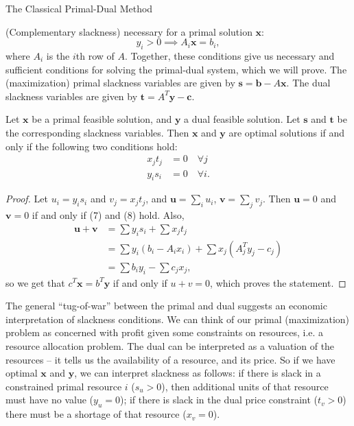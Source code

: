 \begin{section}{The Classical Primal-Dual Method}
\begin{definition}{(Complementary slackness)}
		necessary for a primal solution $\mathbf{x}$:
		\[
			y_i > 0 \implies A_i\mathbf{x} = b_i,
		\]
		where $A_i$ is the $i$th row of $A$. Together, these conditions give us necessary and 
		sufficient conditions for solving the primal-dual system, which we will prove. The 
		(maximization) primal slackness variables are given by 
		$\mathbf{s} = \mathbf{b} - A\mathbf{x}$. The dual slackness variables are given by 
		$\mathbf{t} = A^{T}\mathbf{y} - \mathbf{c}$.
	\end{definition}
	\begin{theorem}
		Let $\mathbf{x}$ be a primal feasible solution, and $\mathbf{y}$ a dual feasible 
		solution. Let $\mathbf{s}$ and $\mathbf{t}$ be the corresponding slackness variables. 
		Then $\mathbf{x}$ and $\mathbf{y}$ are optimal solutions if and only if the following 
		two conditions hold:
		\begin{align}
			x_jt_j &= 0 \quad \forall j \\
			y_is_i &= 0 \quad \forall i.
		\end{align}
	\end{theorem}
	\begin{proof}
		Let $u_i = y_is_i$ and $v_j = x_jt_j$, and $\mathbf{u} = \sum_i u_i$, 
		$\mathbf{v} = \sum_j v_j$. Then $\mathbf{u} = 0$ and $\mathbf{v} = 0$ if and only if 
		(7) and (8) hold. Also, 
		\begin{align*}
			\mathbf{u} + \mathbf{v} &= \sum y_is_i + \sum x_jt_j \\
						&= \sum y_i(b_i - A_ix_i) + \sum x_j (A^{T}_jy_j-c_j)\\
						&= \sum b_iy_i - \sum c_jx_j,
		\end{align*}
		so we get that $c^{T}\mathbf{x} = b^{T}\mathbf{y}$ if and only if $u + v = 0$, which 
		proves the statement.	
	\end{proof}
	The general ``tug-of-war'' between the primal and dual suggests an economic interpretation 
	of slackness conditions. We can think of our primal (maximization) problem as concerned with 
	profit given some constraints on resources, i.e. a resource allocation problem. The dual can 
	be interpreted as a valuation of the resources -- it tells us the availability of a resource, 
	and its price. So if we have optimal $\mathbf{x}$ and $\mathbf{y}$, we can interpret 
	slackness as follows: if there is slack in a constrained primal resource $i$ ($s_u > 0$), 
	then additional units of that resource must have no value ($y_u = 0$); if there is slack 
	in the dual price constraint ($t_v > 0$) there must be a shortage of that resource ($x_v = 0$).\\

\end{section}

